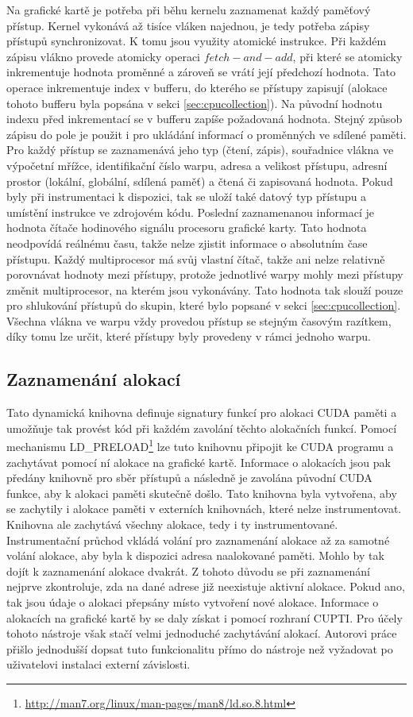 Na grafické kartě je potřeba při běhu kernelu zaznamenat každý paměťový přístup. Kernel vykonává až tisíce vláken najednou, je tedy potřeba zápisy přístupů synchronizovat. K tomu jsou využity atomické instrukce. Při každém zápisu vlákno provede atomicky operaci $fetch-and-add$, při které se atomicky inkrementuje hodnota proměnné a zároveň se vrátí její předchozí hodnota. Tato operace inkrementuje index v bufferu, do kterého se přístupy zapisují (alokace tohoto bufferu byla popsána v sekci \ref{sec:cpucollection}). Na původní hodnotu indexu před inkrementací se v bufferu zapíše požadovaná hodnota. Stejný způsob zápisu do pole je použit i pro ukládání informací o proměnných ve sdílené paměti. Pro každý přístup se zaznamenává jeho typ (čtení, zápis), souřadnice vlákna ve výpočetní mřížce, identifikační číslo warpu, adresa a velikost přístupu, adresní prostor (lokální, globální, sdílená paměť) a čtená či zapisovaná hodnota. Pokud byly při instrumentaci k dispozici, tak se uloží také datový typ přístupu a umístění instrukce ve zdrojovém kódu. Poslední zaznamenanou informací je hodnota čítače hodinového signálu procesoru grafické karty. Tato hodnota neodpovídá reálnému času, takže nelze zjistit informace o absolutním čase přístupu. Každý multiprocesor má svůj vlastní čítač, takže ani nelze relativně porovnávat hodnoty mezi přístupy, protože jednotlivé warpy mohly mezi přístupy změnit multiprocesor, na kterém jsou vykonávány. Tato hodnota tak slouží pouze pro shlukování přístupů do skupin, které bylo popsané v sekci \ref{sec:cpucollection}. Všechna vlákna ve warpu vždy provedou přístup se stejným časovým razítkem, díky tomu lze určit, které přístupy byly provedeny v rámci jednoho warpu.

\subsection{Zaznamenání alokací}
\label{sec:runtimetracker}
Tato dynamická knihovna definuje signatury funkcí pro alokaci CUDA paměti a umožňuje tak provést kód při každém zavolání těchto alokačních funkcí. Pomocí mechanismu LD\_PRELOAD\footnote{\url{http://man7.org/linux/man-pages/man8/ld.so.8.html}} lze tuto knihovnu připojit ke CUDA programu a zachytávat pomocí ní alokace na grafické kartě. Informace o alokacích jsou pak předány knihovně pro sběr přístupů a následně je zavolána původní CUDA funkce, aby k alokaci paměti skutečně došlo. Tato knihovna byla vytvořena, aby se zachytily i alokace paměti v externích knihovnách, které nelze instrumentovat. Knihovna ale zachytává všechny alokace, tedy i ty instrumentované. Instrumentační průchod vkládá volání pro zaznamenání alokace až za samotné volání alokace, aby byla k dispozici adresa naalokované paměti. Mohlo by tak dojít k zaznamenání alokace dvakrát. Z tohoto důvodu se při zaznamenání nejprve zkontroluje, zda na dané adrese již neexistuje aktivní alokace. Pokud ano, tak jsou údaje o alokaci přepsány místo vytvoření nové alokace.
Informace o alokacích na grafické kartě by se daly získat i pomocí rozhraní CUPTI. Pro účely tohoto nástroje však stačí velmi jednoduché zachytávání alokací. Autorovi práce přišlo jednodušší dopsat tuto funkcionalitu přímo do nástroje než vyžadovat po uživatelovi instalaci externí závislosti.

